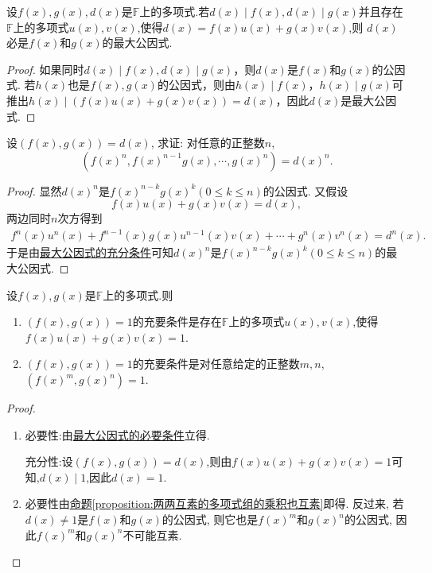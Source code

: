 \documentclass[../../main.tex]{subfiles}%
\begin{document}
\begin{theorem}[最大公因式的充分条件]\label{theorem:最大公因式的充分条件}
设\(f(x),g(x),d(x)\)是\(\mathbb{F}\)上的多项式.若\(d(x)\mid f(x),d(x)\mid g(x)\)并且存在\(\mathbb{F}\)上的多项式$u(x),v(x)$,使得\(d(x)=f(x)u(x)+g(x)v(x)\),则 \(d(x)\)必是\(f(x)\)和\(g(x)\)的最大公因式.
\end{theorem}
\begin{proof}
如果同时\(d(x)\mid f(x),d(x)\mid g(x)\)，则\(d(x)\)是\(f(x)\)和\(g(x)\)的公因式. 若\(h(x)\)也是\(f(x),g(x)\)的公因式，则由\(h(x)\mid f(x)\)，\(h(x)\mid g(x)\)可推出\(h(x)\mid (f(x)u(x)+g(x)v(x)) = d(x)\)，因此\(d(x)\)是最大公因式.
\end{proof}

\begin{example}
设\((f(x),g(x)) = d(x)\), 求证: 对任意的正整数\(n\),
\[
(f(x)^n,f(x)^{n - 1}g(x),\cdots,g(x)^n)=d(x)^n.
\] 
\end{example}
\begin{proof}
显然\(d(x)^n\)是\(f(x)^{n - k}g(x)^k(0\leqslant  k\leqslant  n)\)的公因式. 又假设
\[
f(x)u(x)+g(x)v(x)=d(x),
\]
两边同时\(n\)次方得到
\begin{align*}
f^n\left( x \right) u^n\left( x \right) +f^{n-1}\left( x \right) g\left( x \right) u^{n-1}\left( x \right) v\left( x \right) +\cdots +g^n\left( x \right) v^n\left( x \right) =d^n\left( x \right) .    
\end{align*}
于是由\hyperref[theorem:最大公因式的充分条件]{最大公因式的充分条件}可知\(d(x)^n\)是\(f(x)^{n - k}g(x)^k(0\leqslant  k\leqslant  n)\)的最大公因式.
\end{proof}

\begin{theorem}[多项式互素的充要条件]\label{theorem:多项式互素的充要条件}
设\(f(x),g(x)\)是\(\mathbb{F}\)上的多项式.则
\begin{enumerate}[(1)]
\item \((f(x),g(x)) = 1\)的充要条件是存在\(\mathbb{F}\)上的多项式\(u(x),v(x)\),使得$f(x)u(x)+g(x)v(x)=1.$
\item \((f(x),g(x)) = 1\)的充要条件是对任意给定的正整数\(m,n\), \((f(x)^m,g(x)^n)=1\).
\end{enumerate}
\end{theorem}
\begin{proof}
\begin{enumerate}
\item 必要性:由\hyperref[theorem:最大公因式的必要条件]{最大公因式的必要条件}立得.

充分性:设$(f(x),g(x))=d(x)$,则由$f(x)u(x)+g(x)v(x)=1$可知,$d(x)\mid 1$,因此$d(x)=1.$

\item 必要性由\hyperref[proposition:两两互素的多项式组的乘积也互素]{命题\ref{proposition:两两互素的多项式组的乘积也互素}}即得. 反过来, 若\(d(x)\neq 1\)是\(f(x)\)和\(g(x)\)的公因式, 则它也是\(f(x)^m\)和\(g(x)^n\)的公因式, 因此\(f(x)^m\)和\(g(x)^n\)不可能互素.
\end{enumerate}
\end{proof}
\end{document}
